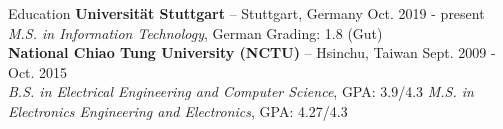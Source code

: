 \documentclass{resume} %
\begin{document}

\begin{rSection}{Education}
{\bf Universität Stuttgart }{--  Stuttgart, Germany}  \hfill {Oct. 2019 - present}\\
{\em M.S. in Information Technology}{, German Grading: 1.8 (Gut) \\ 
{\bf National Chiao Tung University (NCTU) }{--  Hsinchu, Taiwan} \hfill {Sept. 2009 - Oct. 2015}\\
{\em B.S. in Electrical Engineering and Computer Science}{, GPA: 3.9/4.3}
\em M.S. in Electronics Engineering and Electronics}{, GPA: 4.27/4.3} 

\end{rSection}
\end{document}
